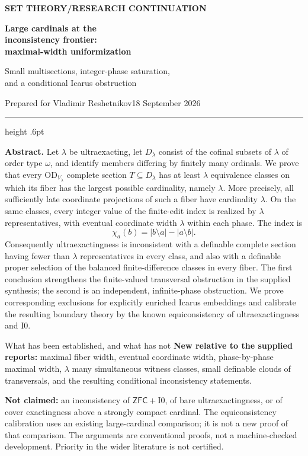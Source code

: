 \documentclass[11pt,letterpaper]{article}
\theoremstyle{definition}
\newcommand{\ZFC}{\mathsf{ZFC}}
\newcommand{\OD}{\mathrm{OD}}
\newcommand{\Izero}{\mathrm{I0}}
\numberwithin{equation}{section}
\newcommand{\ch}{\chi}
\begin{document}
\thispagestyle{empty}
{\sffamily\bfseries\small\color{Olive}SET THEORY\quad /\quad RESEARCH CONTINUATION}

\vspace{13pt}
{\fontsize{28}{31}\selectfont\bfseries\color{Forest}Large cardinals at the\\ inconsistency frontier:\\ maximal-width uniformization\par}
\vspace{10pt}
{\fontsize{14}{18}\selectfont Small multisections, integer-phase saturation,\\ and a conditional Icarus obstruction\par}
\vspace{14pt}
{\color{Muted}Prepared for Vladimir Reshetnikov\hfill 18 September 2026\par}
\vspace{3pt}
{\color{Sage}\hrule height .6pt}
\vspace{12pt}

\textbf{Abstract.}
Let $\lambda$ be ultraexacting, let $D_\lambda$ consist of the cofinal subsets of $\lambda$ of order type $\omega$, and identify members differing by finitely many ordinals. We prove that every $\OD_{V_\lambda}$ complete section $T\subseteq D_\lambda$ has at least $\lambda$ equivalence classes on which its fiber has the largest possible cardinality, namely $\lambda$. More precisely, all sufficiently late coordinate projections of such a fiber have cardinality $\lambda$. On the same classes, every integer value of the finite-edit index is realized by $\lambda$ representatives, with eventual coordinate width $\lambda$ within each phase. The index is
\[
\ch_a(b)=|b\setminus a|-|a\setminus b|.
\]
Consequently ultraexactingness is inconsistent with a definable complete section having fewer than $\lambda$ representatives in every class, and also with a definable proper selection of the balanced finite-difference classes in every fiber. The first conclusion strengthens the finite-valued transversal obstruction in the supplied synthesis; the second is an independent, infinite-phase obstruction. We prove corresponding exclusions for explicitly enriched Icarus embeddings and calibrate the resulting boundary theory by the known equiconsistency of ultraexactingness and $\Izero$.

\begin{assessment}{What has been established, and what has not}
\textbf{New relative to the supplied reports:} maximal fiber width, eventual coordinate width, phase-by-phase maximal width, $\lambda$ many simultaneous witness classes, small definable clouds of transversals, and the resulting conditional inconsistency statements.

\textbf{Not claimed:} an inconsistency of $\ZFC+\Izero$, of bare ultraexactingness, or of cover exactingness above a strongly compact cardinal. The equiconsistency calibration uses an existing large-cardinal comparison; it is not a new proof of that comparison. The arguments are conventional proofs, not a machine-checked development. Priority in the wider literature is not certified.
\end{assessment}
\end{document}
